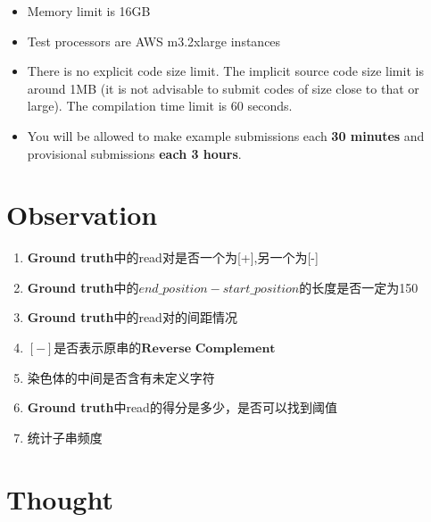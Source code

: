 \documentclass[hyperref,UTF8]{ctexart}
\theoremstyle{definition}
\theoremstyle{remark}
\numberwithin{equation}{subsection}
\newcommand{\Emph}{\textbf}
\begin{document}
	\begin{itemize}
	
		\item Memory limit is 16GB
		
		\item Test processors are AWS m3.2xlarge instances
		
		\item There is no explicit code size limit. The implicit source code size limit is around 1MB
		(it is not advisable to submit codes of size close to that or large). The compilation time limit is 60 seconds.
		
		\item You will be allowed to make example submissions each \Emph{30 minutes} and provisional submissions \Emph{each 3 hours}.
		
	\end{itemize}
	
	
\section{Observation}
\label{sec:observation}
	
	\begin{enumerate}
		
		\item \Emph{Ground truth}中的read对是否一个为[+],另一个为[-]

		\item \Emph{Ground truth}中的$end\_position - start\_position$的长度是否一定为150

		\item \Emph{Ground truth}中的read对的间距情况
	
		\item $[-]$是否表示原串的$\Emph{Reverse Complement}$
				
		\item 染色体的中间是否含有未定义字符

		\item \Emph{Ground truth}中read的得分是多少，是否可以找到阈值
		
		\item 统计子串频度
	
	\end{enumerate}
	
\section{Thought}
\label{sec:thought}
		
\end{document}
